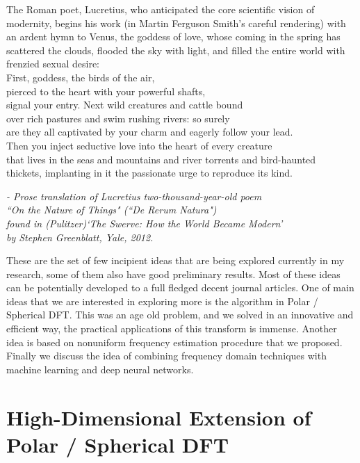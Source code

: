 \documentclass{UCF_ETD}
\begin{document}
\epigraph{The Roman poet, Lucretius, who anticipated the core scientific vision of modernity, begins his work (in Martin Ferguson Smith’s careful rendering) with an ardent hymn to Venus, the goddess of love, whose coming in the spring has scattered the clouds, flooded the sky with light, and filled the entire world with frenzied sexual desire: \\
First, goddess, the birds of the air, \\
pierced to the heart with your powerful shafts,\\
signal your entry. Next wild creatures and cattle bound\\
over rich pastures and swim rushing rivers: so surely \\
are they all captivated by your charm and eagerly follow your lead.\\
Then you inject seductive love into the heart of every creature \\
that lives in the seas and mountains and river torrents and bird-haunted\\ thickets, implanting in it the passionate urge to reproduce its kind.}{\itshape - Prose translation of Lucretius two-thousand-year-old poem \\ ``On the Nature of Things" (``\emph{De Rerum Natura}") \\ found in (Pulitzer)`The Swerve: How the World Became Modern' \\ by Stephen Greenblatt, Yale, 2012.}

These are the set of few incipient ideas that are being explored currently in my research, some of them also have good preliminary results. Most of these ideas can be potentially developed to a full fledged decent journal articles. One of main ideas that we are interested in exploring more is the algorithm in Polar / Spherical DFT. This was an age old problem, and we solved in an innovative and efficient way, the practical applications of this transform is immense. Another idea is based on nonuniform frequency estimation procedure that we proposed. Finally we discuss the idea of combining frequency domain techniques with machine learning and deep neural networks. 

\section{High-Dimensional Extension of Polar / Spherical DFT}
\end{document}
